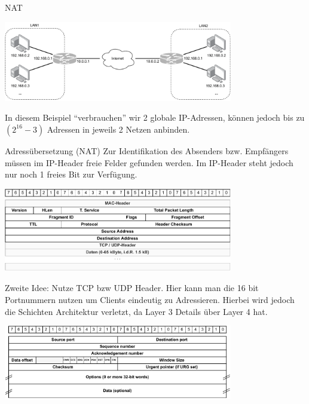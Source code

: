 \begin{example}{NAT}
    \begin{center}
        \includegraphics[width=0.75\textwidth]{includes/figures/defi_nat.pdf}
    \end{center}

    In diesem Beispiel \enquote{verbrauchen} wir 2 globale IP-Adressen, können jedoch bis zu $(2^{16} - 3)$ Adressen in jeweils 2 Netzen anbinden.
\end{example}

\begin{defi}{Adressübersetzung (NAT)}
    Zur Identifikation des Absenders bzw. Empfängers müssen im IP-Header freie Felder gefunden werden.
    Im IP-Header steht jedoch nur noch 1 freies Bit zur Verfügung.

    \begin{center}
        \includegraphics[width=0.75\textwidth]{includes/figures/defi_ip_header.pdf}
    \end{center}

    Zweite Idee: Nutze TCP bzw UDP Header.
    Hier kann man die 16 bit Portnummern nutzen um Clients eindeutig zu Adressieren.
    Hierbei wird jedoch die Schichten Architektur verletzt, da Layer 3 Details über Layer 4 hat.

    \begin{center}
        \includegraphics[width=0.75\textwidth]{includes/figures/defi_tcp_header.pdf}
    \end{center}
\end{defi}